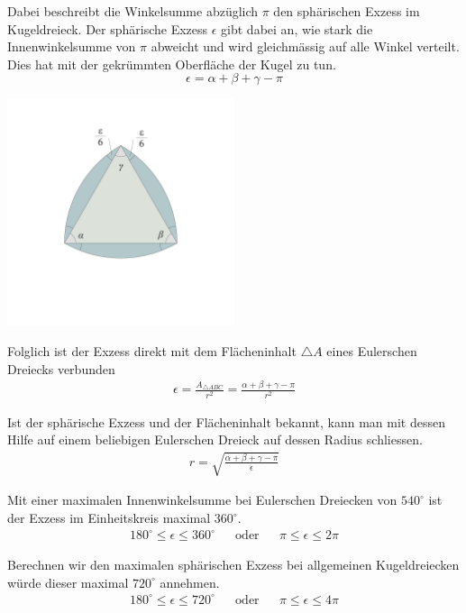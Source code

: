 \begin{refsection}
Dabei beschreibt die Winkelsumme abzüglich $\pi$ den sphärischen Exzess im Kugeldreieck.
Der sphärische Exzess $\epsilon$ gibt dabei an, wie stark die Innenwinkelsumme von $\pi$ abweicht und wird gleichmässig auf alle Winkel verteilt. Dies hat mit der gekrümmten Oberfläche der Kugel zu tun.
\begin{equation}
\epsilon = \alpha + \beta + \gamma - \pi
\end{equation}

\begin{center}
        \includegraphics[width=0.5\textwidth]{kugel/SphaerischerExzess.jpg}
\end{center}

Folglich ist der Exzess direkt mit dem Flächeninhalt $\triangle A$ eines Eulerschen Dreiecks verbunden
\begin{align*}
\epsilon =\frac{A_{\triangle{ ABC }}}{r^2} = \frac{\alpha + \beta + \gamma - \pi}{r^2}
\end{align*}

Ist der sphärische Exzess und der Flächeninhalt bekannt, kann man mit dessen Hilfe auf einem beliebigen Eulerschen Dreieck auf dessen Radius schliessen.
\begin{align*}
r = \sqrt{\frac{\alpha + \beta + \gamma - \pi}{\epsilon}}
\end{align*}

Mit einer maximalen Innenwinkelsumme bei Eulerschen Dreiecken von $540^{\circ}$ ist der Exzess im Einheitskreis maximal $360^{\circ}$.
\[
\begin{aligned}
180^{\circ} \le \epsilon \le 360^{\circ}
&
&\text{oder}
&
&\pi \le \epsilon \le 2\pi
\end{aligned}
\]

Berechnen wir den maximalen sphärischen Exzess bei allgemeinen Kugeldreiecken würde dieser maximal $720^{\circ}$ annehmen.
\[
\begin{aligned}
180^{\circ} \le \epsilon \le 720^{\circ}
&
&\text{oder}
&
&\pi \le \epsilon \le 4\pi
\end{aligned}
\]




\end{refsection}
